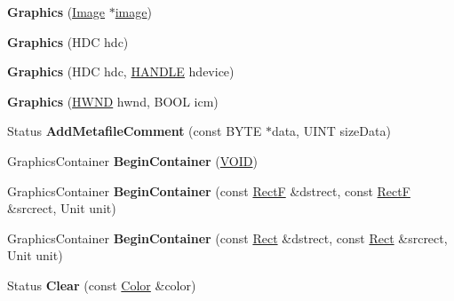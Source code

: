\begin{DoxyCompactItemize}
\item 
\mbox{\label{class_graphics_ab0a95f60962944795ac49e987211710c}} 
{\bfseries Graphics} (\hyperlink{class_image}{Image} $\ast$\hyperlink{interfacevoid}{image})
\item 
\mbox{\label{class_graphics_a6218674644fd871c694928478e0f25b5}} 
{\bfseries Graphics} (H\+DC hdc)
\item 
\mbox{\label{class_graphics_abaece6f05ef807d960542cdcb8e3fa03}} 
{\bfseries Graphics} (H\+DC hdc, \hyperlink{interfacevoid}{H\+A\+N\+D\+LE} hdevice)
\item 
\mbox{\label{class_graphics_a23f6fd0d2081c55e3197f7a5849c3859}} 
{\bfseries Graphics} (\hyperlink{interfacevoid}{H\+W\+ND} hwnd, B\+O\+OL icm)
\item 
\mbox{\label{class_graphics_a6f8fa8e5c091209e1d46968eb2da19f1}} 
Status {\bfseries Add\+Metafile\+Comment} (const B\+Y\+TE $\ast$data, U\+I\+NT size\+Data)
\item 
\mbox{\label{class_graphics_a19bed1c3c502415d4518f6f3664dab6e}} 
Graphics\+Container {\bfseries Begin\+Container} (\hyperlink{interfacevoid}{V\+O\+ID})
\item 
\mbox{\label{class_graphics_a8d1d58ea53bd857f3d8388666a786b2d}} 
Graphics\+Container {\bfseries Begin\+Container} (const \hyperlink{struct_rect_f}{RectF} \&dstrect, const \hyperlink{struct_rect_f}{RectF} \&srcrect, Unit unit)
\item 
\mbox{\label{class_graphics_ae58b5eedbe8e7e8ec46a279fd23acfb7}} 
Graphics\+Container {\bfseries Begin\+Container} (const \hyperlink{struct_rect}{Rect} \&dstrect, const \hyperlink{struct_rect}{Rect} \&srcrect, Unit unit)
\item 
\mbox{\label{class_graphics_a2685553204b51b19859deb618fc21f92}} 
Status {\bfseries Clear} (const \hyperlink{struct_color}{Color} \&color)
\item 
\mbox{\label{class_graphics_a8d5e4395b1d8fc11535349dc79a4991e}} 

\end{DoxyCompactItemize}
